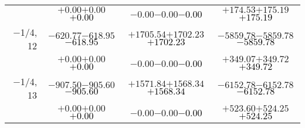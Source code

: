 \documentclass[compress]{beamer}
\begin{document}
\begin{frame}
{\begin{tabular}{r | c | c | c}
           & $+0.00$\hspace{0.1 cm}$+0.00$\hspace{0.1 cm}\textcolor{black}{$+0.00$} & $-0.00$\hspace{0.1 cm}$-0.00$\hspace{0.1 cm}\textcolor{black}{$-0.00$} & $+174.53$\hspace{0.1 cm}$+175.19$\hspace{0.1 cm}\textcolor{black}{$+175.19$} \\
$-$1/4, 12 & $-620.77$\hspace{0.1 cm}$-618.95$\hspace{0.1 cm}\textcolor{black}{$-618.95$} & $+1705.54$\hspace{0.1 cm}$+1702.23$\hspace{0.1 cm}\textcolor{black}{$+1702.23$} & $-5859.78$\hspace{0.1 cm}$-5859.78$\hspace{0.1 cm}\textcolor{black}{$-5859.78$} \\
           & $+0.00$\hspace{0.1 cm}$+0.00$\hspace{0.1 cm}\textcolor{black}{$+0.00$} & $-0.00$\hspace{0.1 cm}$-0.00$\hspace{0.1 cm}\textcolor{black}{$-0.00$} & $+349.07$\hspace{0.1 cm}$+349.72$\hspace{0.1 cm}\textcolor{black}{$+349.72$} \\
$-$1/4, 13 & $-907.50$\hspace{0.1 cm}$-905.60$\hspace{0.1 cm}\textcolor{black}{$-905.60$} & $+1571.84$\hspace{0.1 cm}$+1568.34$\hspace{0.1 cm}\textcolor{black}{$+1568.34$} & $-6152.78$\hspace{0.1 cm}$-6152.78$\hspace{0.1 cm}\textcolor{black}{$-6152.78$} \\
           & $+0.00$\hspace{0.1 cm}$+0.00$\hspace{0.1 cm}\textcolor{black}{$+0.00$} & $-0.00$\hspace{0.1 cm}$-0.00$\hspace{0.1 cm}\textcolor{black}{$-0.00$} & $+523.60$\hspace{0.1 cm}$+524.25$\hspace{0.1 cm}\textcolor{black}{$+524.25$} \\

\end{tabular}}
\end{frame}
\end{document}
